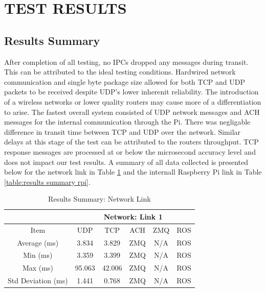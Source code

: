 \section{TEST RESULTS}

\subsection{Results Summary}

After completion of all testing, no IPCs dropped any messages during transit. This can be attributed to the ideal testing conditions. Hardwired network communication and single byte package size allowed for both TCP and UDP packets to be received despite UDP's lower inherenit reliability. The introduction of a wireless networks or lower quality routers may cause more of a differentiation to arise. The fastest overall system consisted of UDP network messages and ACH messages for the internal communication through the Pi. There was negligable difference in transit time between TCP and UDP over the network. Similar delays at this stage of the test can be attributed to the routers throughput. TCP response messages are processed at or below the microsecond accuracy level and does not impact our test results. A summary of all data collected is presented below for the network link in Table \ref{table:results summary net} and the internall Raspberry Pi link in Table \ref{table:results summary rpi}.

\begin{table}[h]
\caption{Results Summary: Network Link}
\label{table:results summary net}
\begin{center}
\begin{tabular}{c|c||c||c||c||c|}
\cline{2-6}
& \multicolumn{5}{c|}{Network: Link 1}\\
\hline
\multicolumn{1}{|c|}{Item} & UDP & TCP & ACH & ZMQ & ROS\\
\hline
\multicolumn{1}{|c|}{Average (ms)} & 3.834 & 3.829 & ZMQ & N/A & ROS\\
\hline
\multicolumn{1}{|c|}{Min (ms)} & 3.359 & 3.399 & ZMQ & N/A & ROS\\
\hline
\multicolumn{1}{|c|}{Max (ms)} & 95.063 & 42.006 & ZMQ & N/A & ROS\\
\hline
\multicolumn{1}{|c|}{Std Deviation (ms)} & 1.441 & 0.768 & ZMQ & N/A & ROS\\
\hline
\end{tabular}
\end{center}
\end{table}


